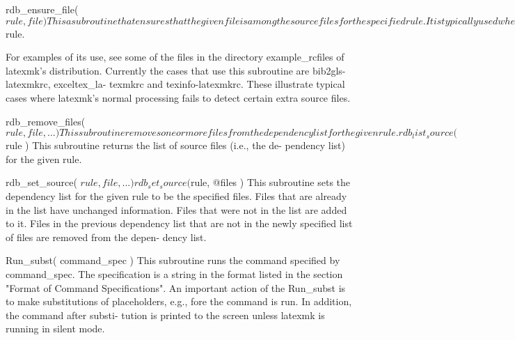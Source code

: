        rdb_ensure_file( $rule, file )
              This  a subroutine that ensures that the given file is among the
              source files for the specified rule.  It is typically used when,
              during  the  processing of a rule, it is known that a particular
              extra file is among the dependencies that latexmk  should  know,
              but its default methods don't find the dependency. Almost always
              the first argument is the name of the rule currently being  pro-
              cessed, so it is then appropriate to specify it by $rule.

              For  examples of its use, see some of the files in the directory
              example_rcfiles of latexmk's distribution.  Currently the  cases
              that  use  this  subroutine  are bib2gls-latexmkrc, exceltex_la-
              texmkrc and texinfo-latexmkrc.  These illustrate  typical  cases
              where  latexmk's normal processing fails to detect certain extra
              source files.

       rdb_remove_files( $rule, file, ... )
              This subroutine removes one or more files  from  the  dependency
              list for the given rule.

       rdb_list_source( $rule )
              This  subroutine returns the list of source files (i.e., the de-
              pendency list) for the given rule.

       rdb_set_source( $rule, file, ... )

       rdb_set_source( $rule, @files )
              This subroutine sets the dependency list for the given  rule  to
              be the specified files.  Files that are already in the list have
              unchanged information.  Files that were  not  in  the  list  are
              added to it.  Files in the previous dependency list that are not
              in the newly specified list of files are removed from the depen-
              dency list.

       Run_subst( command_spec )
              This subroutine runs the command specified by command_spec.  The
              specification is a string in the format listed  in  the  section
              "Format  of Command Specifications".  An important action of the
              Run_subst is to make substitutions of placeholders, e.g., %
              fore the command is run.  In addition, the command after substi-
              tution  is  printed  to  the screen unless latexmk is running in
              silent mode.


